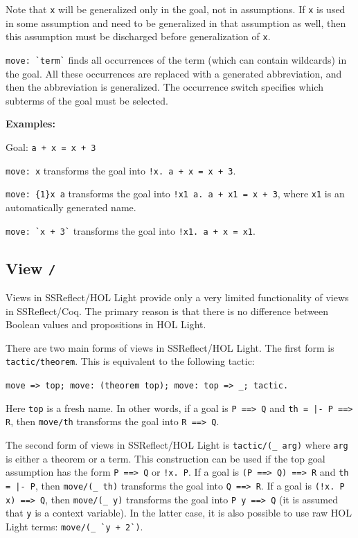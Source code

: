 \documentclass[a4paper]{article}
\begin{document}
Note that \verb|x| will be generalized only in the goal, not in assumptions. If \verb|x| is used in some assumption and need to be generalized in that assumption as well, then this assumption must be discharged before generalization of \verb|x|.

\verb|move: `term`| finds all occurrences of the term (which can contain wildcards) in the goal. All these occurrences are replaced with a generated abbreviation, and then the abbreviation is generalized. The occurrence switch specifies which subterms of the goal must be selected.

{\bf Examples:}

Goal: \verb|a + x = x + 3|

\verb|move: x| transforms the goal into \verb|!x. a + x = x + 3|.

\verb|move: {1}x a| transforms the goal into \verb|!x1 a. a + x1 = x + 3|, where \verb|x1| is an automatically generated name.

\verb|move: `x + 3`| transforms the goal into \verb|!x1. a + x = x1|.



\subsection{View {\tt /}}
Views in SSReflect/HOL Light provide only a very limited functionality of views in SSReflect/Coq. The primary reason is that there is no difference between Boolean values and propositions in HOL Light.

There are two main forms of views in SSReflect/HOL Light. The first form is \verb$tactic/theorem$. This is equivalent to the following tactic: 

\verb|move => top; move: (theorem top); move: top => _; tactic.|

Here \verb|top| is a fresh name. In other words, if a goal is \verb|P ==> Q| and \verb$th = |- P ==> R$, then \verb|move/th| transforms the goal into \verb|R ==> Q|.

The second form of views in SSReflect/HOL Light is \verb$tactic/(_ arg)$ where \verb|arg| is either a theorem or a term. This construction can be used if the top goal assumption has the form \verb|P ==> Q| or \verb|!x. P|. If a goal is \verb|(P ==> Q) ==> R| and \verb$th = |- P$, then \verb|move/(_ th)| transforms the goal into \verb|Q ==> R|. If a goal is \verb|(!x. P x) ==> Q|, then \verb|move/(_ y)| transforms the goal into \verb|P y ==> Q| (it is assumed that \verb|y| is a context variable). In the latter case, it is also possible to use raw HOL Light terms: \verb|move/(_ `y + 2`)|.
\end{document}
